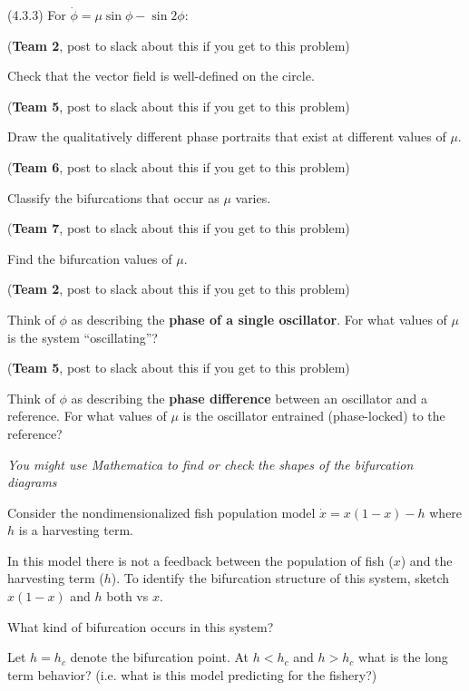 \documentclass[12pt,letterpaper,noanswers]{exam}
\begin{document}
\begin{questions}
\item (4.3.3) For $\dot{\phi} = \mu \sin \phi - \sin 2\phi$:
\begin{parts}
\item (\textbf{Team 2}, post to slack about this if you get to this problem)

Check that the vector field is well-defined on the circle.
\item (\textbf{Team 5}, post to slack about this if you get to this problem)

Draw the qualitatively different phase portraits that exist at different values of $\mu$.
\item (\textbf{Team 6}, post to slack about this if you get to this problem)

Classify the bifurcations that occur as $\mu$ varies.
\item (\textbf{Team 7}, post to slack about this if you get to this problem)

Find the bifurcation values of $\mu$. 
\item (\textbf{Team 2}, post to slack about this if you get to this problem)

Think of $\phi$ as describing the \textbf{phase of a single oscillator}.  For what values of $\mu$ is the system ``oscillating''?
\item (\textbf{Team 5}, post to slack about this if you get to this problem)

Think of $\phi$ as describing the \textbf{phase difference} between an oscillator and a reference.  For what values of $\mu$ is the oscillator entrained (phase-locked) to the reference?
\end{parts}

\emph{You might use Mathematica to find or check the shapes of the bifurcation diagrams}

\item Consider the nondimensionalized fish population model $\dot x = x(1-x) - h$ where $h$ is a harvesting term.

In this model there is not a feedback between the population of fish ($x$) and the harvesting term ($h$). 
To identify the bifurcation structure of this system, sketch $x(1-x)$ and $h$ both vs $x$. 

\begin{parts}
    \item What kind of bifurcation occurs in this system?
    \item Let $h = h_c$ denote the bifurcation point.  At $h<h_c$ and $h>h_c$ what is the long term behavior?  (i.e. what is this model predicting for the fishery?)
\end{parts}   


\end{questions}
\end{document}
